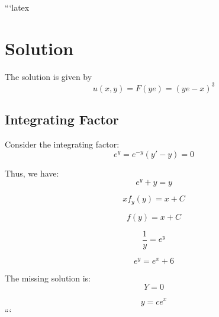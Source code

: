 ```latex
\section*{Solution}

The solution is given by
\[
u(x, y) = F(ye) = (ye - x)^3
\]

\subsection*{Integrating Factor}

Consider the integrating factor:
\[
e^{y} = e^{-y} (y' - y) = 0
\]

Thus, we have:
\[
e^{y} + y = y
\]

\[
x f_y(y) = x + C
\]

\[
f(y) = x + C
\]

\[
\frac{1}{y} = e^{y}
\]

\[
e^{y} = e^{x} + 6
\]

The missing solution is:
\[
Y = 0
\]

\[
y = c e^{x}
\]
```
